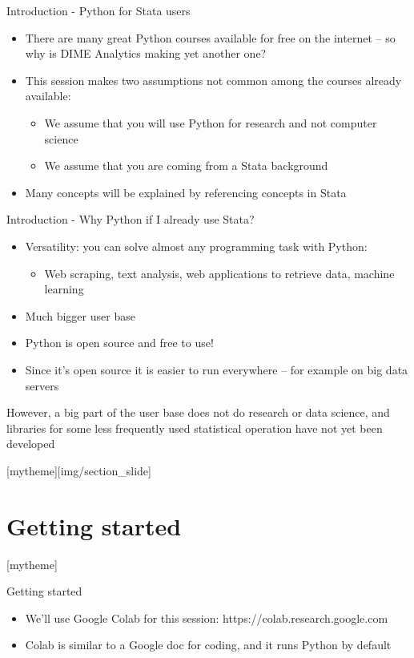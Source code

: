 \documentclass[aspectratio=169]{beamer}
\newcommand{\sectionpic}[2]{
	\setbeamertemplate{section page}[mytheme][#2]
	\section{#1}
	\setbeamertemplate{section page}[mytheme]
}
\begin{document}
\begin{frame}{Introduction - Python for Stata users}
	
	\begin{itemize}
		\item There are many great Python courses available for free on the internet -- so why is DIME Analytics making yet another one?
		\item This session makes two assumptions not common among the courses already available:
		\begin{itemize}
			\item We assume that you will use Python for research and not computer science
			\item We assume that you are coming from a Stata background 
		\end{itemize}
		\item Many concepts will be explained by referencing concepts in Stata
	\end{itemize}
	
\end{frame}

\begin{frame}{Introduction - Why Python if I already use Stata?}

	\begin{itemize}
		\item Versatility: you can solve almost any programming task with Python:
		\begin{itemize}
			\item Web scraping, text analysis, web applications to retrieve data, machine learning
		\end{itemize}
		\item Much bigger user base
		\item Python is open source and free to use!
		\item Since it's open source it is easier to run everywhere -- for example on big data servers
	\end{itemize}

	However, a big part of the user base does not do research or data science, 
	and libraries for some less frequently used statistical operation 
	have not yet been developed

\end{frame}

\sectionpic{Getting started}{img/section_slide}

\begin{frame}{Getting started}

	\begin{itemize}
		\item We'll use Google Colab for this session: https://colab.research.google.com
		\item Colab is similar to a Google doc for coding, and it runs Python by default
	\end{itemize}

\end{frame}
\end{document}
